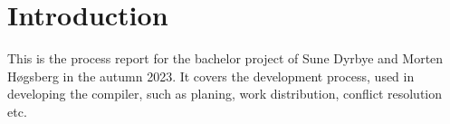 \section{Introduction}

This is the process report for the bachelor project of Sune Dyrbye and Morten
Høgsberg in the autumn 2023.  It covers the development process, used in developing the
\lang{} compiler, such as planing, work distribution, conflict resolution etc.
